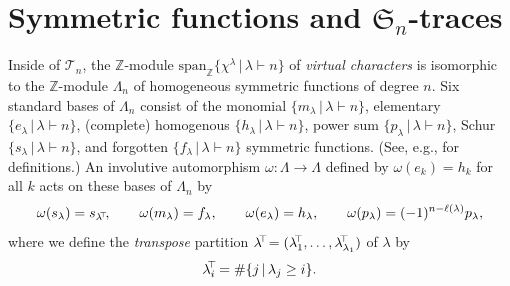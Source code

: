 \documentclass[12pt]{amsart}
\numberwithin{equation}{section}
\newcommand{\sn}{\mathfrak{S}_n}
\newcommand{\spn}{\mathrm{span}}
\newcommand{\tr}{{\negthickspace \top \negthickspace}}
\newcommand{\trspace}[1]{\mathcal{T}_{#1}}
\begin{document}
\section{Symmetric functions and $\sn$-traces}\label{s:tracesf}
Inside of $\trspace n$, the $\mathbb Z$-module
$\spn_{\mathbb Z}\{ \chi^\lambda \,|\, \lambda \vdash n \}$
of {\em virtual characters}
is isomorphic to the $\mathbb Z$-module $\Lambda_n$
of homogeneous symmetric functions of degree $n$.
Six standard bases of $\Lambda_n$ consist of the
monomial $\{m_\lambda \,|\, \lambda \vdash n\}$,
elementary $\{e_\lambda \,|\, \lambda \vdash n\}$,
(complete) homogenous $\{h_\lambda \,|\, \lambda \vdash n\}$,
power sum $\{p_\lambda \,|\, \lambda \vdash n\}$,
Schur $\{s_\lambda \,|\, \lambda \vdash n\}$, and
forgotten $\{f_\lambda \,|\, \lambda \vdash n\}$ symmetric functions.
(See, e.g., \cite[Ch.\,7]{StanEC2} for definitions.)
An involutive automorphism $\omega: \Lambda \rightarrow \Lambda$ defined
by $\omega(e_k) = h_k$ for all $k$ acts on these bases of $\Lambda_n$ by
\begin{equation*}
  \omega(s_\lambda) = s_{\lambda^\tr}, \qquad
  \omega(m_\lambda) = f_\lambda, \qquad
  \omega(e_\lambda) = h_\lambda, \qquad
  \omega(p_\lambda) = (-1)^{n-\ell(\lambda)}p_\lambda,
\end{equation*}
where we define the {\em transpose} partition
$\lambda^\tr = (\lambda^\tr_1, \dotsc, \lambda^\tr_{\lambda_1})$ of $\lambda$
by
\begin{equation*}
  \lambda^\tr_i = \# \{ j \,|\, \lambda_j \geq i \}.
\end{equation*}
\end{document}
